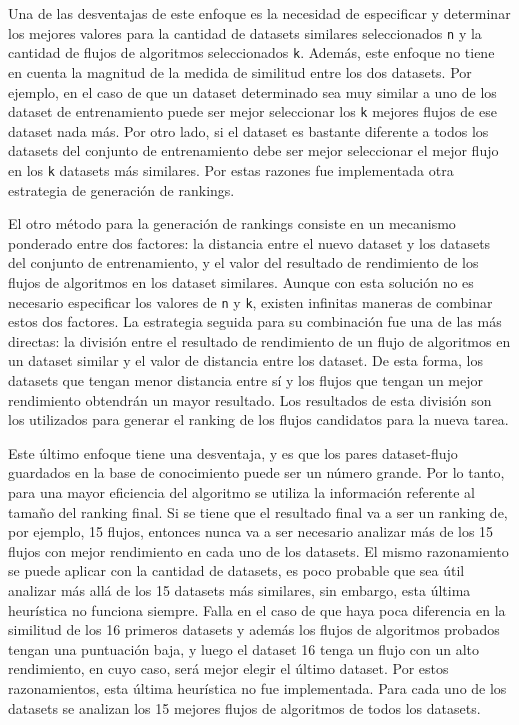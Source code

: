 Una de las desventajas de este enfoque es la necesidad de especificar y determinar los mejores valores para la cantidad de datasets similares seleccionados \texttt{n} y la cantidad de flujos de algoritmos seleccionados \texttt{k}. Además, este enfoque no tiene en cuenta la magnitud de la medida de similitud entre los dos datasets. Por ejemplo, en el caso de que un dataset determinado sea muy similar a uno de los dataset de entrenamiento puede ser mejor seleccionar los \texttt{k} mejores flujos de ese dataset nada más. Por otro lado, si el dataset es bastante diferente a todos los datasets del conjunto de entrenamiento debe ser mejor seleccionar el mejor flujo en los \texttt{k} datasets más similares. Por estas razones fue implementada otra estrategia de generación de rankings. 

El otro método para la generación de rankings consiste en un mecanismo ponderado entre dos factores: la distancia entre el nuevo dataset y los datasets del conjunto de entrenamiento, y el valor del resultado de rendimiento de los flujos de algoritmos en los dataset similares. Aunque con esta solución no es necesario especificar los valores de \texttt{n} y \texttt{k}, existen infinitas maneras de combinar estos dos factores. La estrategia seguida para su combinación fue una de las más directas: la división entre el resultado de rendimiento de un flujo de algoritmos en un dataset similar y el valor de distancia entre los dataset. De esta forma, los datasets que tengan menor distancia entre sí y los flujos que tengan un mejor rendimiento obtendrán un mayor resultado. Los resultados de esta división son los utilizados para generar el ranking de los flujos candidatos para la nueva tarea.

Este último enfoque tiene una desventaja, y es que los pares dataset-flujo guardados en la base de conocimiento puede ser un número grande. Por lo tanto, para una mayor eficiencia del algoritmo se utiliza la información referente al tamaño del ranking final. Si se tiene que el resultado final va a ser un ranking de, por ejemplo, 15 flujos, entonces nunca va a ser necesario analizar más de los 15 flujos con mejor rendimiento en cada uno de los datasets. El mismo razonamiento se puede aplicar con la cantidad de datasets, es poco probable que sea útil analizar más allá de los 15 datasets más similares, sin embargo, esta última heurística no funciona siempre. Falla en el caso de que haya poca diferencia en la similitud de los 16 primeros datasets y además los flujos de algoritmos probados tengan una puntuación baja, y luego el dataset 16 tenga un flujo con un alto rendimiento, en cuyo caso, será mejor elegir el último dataset. Por estos razonamientos, esta última heurística no fue implementada. Para cada uno de los datasets se analizan los 15 mejores flujos de algoritmos de todos los datasets.

